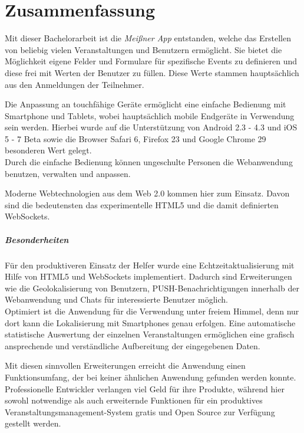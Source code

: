 \chapter{Zusammenfassung}
Mit dieser Bachelorarbeit ist die \emph{Meißner App} entstanden, welche das Erstellen von beliebig vielen Veranstaltungen und Benutzern ermöglicht. Sie bietet die Möglichkeit eigene Felder und Formulare für spezifische Events zu definieren und diese frei mit Werten der Benutzer zu füllen. Diese Werte stammen hauptsächlich aus den Anmeldungen der Teilnehmer.\par

Die Anpassung an touchfähige Geräte ermöglicht eine einfache Bedienung mit Smartphone und Tablets, wobei hauptsächlich mobile Endgeräte in Verwendung sein werden. Hierbei wurde auf die Unterstützung von Android 2.3 - 4.3 und iOS 5 - 7 Beta sowie die Browser Safari 6, Firefox 23 und Google Chrome 29 besonderen Wert gelegt.\\
Durch die einfache Bedienung können ungeschulte Personen die Webanwendung benutzen, verwalten und anpassen.\par

Moderne Webtechnologien aus dem Web 2.0 kommen hier zum Einsatz. Davon sind die bedeutensten das experimentelle HTML5 und die damit definierten WebSockets.

\paragraph{Besonderheiten} 
Für den produktiveren Einsatz der Helfer wurde eine Echtzeitaktualisierung mit Hilfe von HTML5 und WebSockets implementiert. Dadurch sind Erweiterungen wie die Geolokalisierung von Benutzern, PUSH-Benachrichtigungen innerhalb der Webanwendung und Chats für interessierte Benutzer möglich.\\
Optimiert ist die Anwendung für die Verwendung unter freiem Himmel, denn nur dort kann die Lokalisierung mit Smartphones genau erfolgen. Eine automatische statistische Auswertung der einzelnen Veranstaltungen ermöglichen eine grafisch ansprechende und verständliche Aufbereitung der eingegebenen Daten.\par

Mit diesen sinnvollen Erweiterungen erreicht die Anwendung einen Funktionsumfang, der bei keiner ähnlichen Anwendung gefunden werden konnte. Professionelle Entwickler verlangen viel Geld für ihre Produkte, während hier sowohl notwendige als auch erweiternde Funktionen für ein produktives Veranstaltungsmanagement-System gratis und Open Source zur Verfügung gestellt werden.\par

